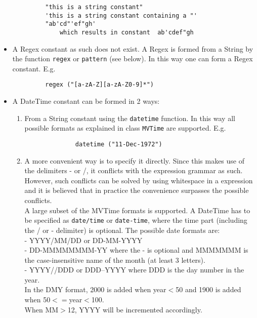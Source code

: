 \begin{itemize}
\begin{verbatim}
         "this is a string constant"
         'this is a string constant containing a "'
         "ab'cd"'ef"gh'
             which results in constant  ab'cdef"gh
       \end{verbatim}
  \item A Regex constant as such does not exist. A Regex is formed from a String
       by the function \texttt{regex} or \texttt{pattern} (see below).
       In this way one can form a Regex constant. E.g.
       \begin{verbatim}
         regex ("[a-zA-Z][a-zA-Z0-9]*")
       \end{verbatim}
  \item A DateTime constant can be formed in 2 ways:
       \begin{enumerate}
         \item From a String constant using the \texttt{datetime} function.
              In this way all possible formats as explained in class
              \texttt{MVTime} are supported. E.g.
              \begin{verbatim}
              datetime ("11-Dec-1972")
              \end{verbatim}
         \item A more convenient way is to specify it directly. Since this
              makes use of the delimiters - or /, it conflicts with the
              expression grammar as such. However, such conflicts can be
              solved by using whitespace in a expression and it is believed
              that in practice the convenience surpasses the possible
              conflicts.
              \\A large subset of the MVTime formats is supported.
              A DateTime has to be specified as \texttt{date/time}
              or \texttt{date-time}, where the time part (including
              the / or - delimiter) is optional.
              The possible date formats are:
              \\- YYYY/MM/DD or DD-MM-YYYY
              \\- DD-MMMMMMMM-YY where the - is optional and MMMMMMM is the
              case-insensitive name of the month (at least 3 letters).
              \\- YYYY//DDD or DDD--YYYY where DDD is the day number in
              the year.
              \\In the DMY format, 2000 is added when year$<$50 and
              1900 is added when 50$<=$year$<$100.
              \\When MM$>$12, YYYY will be incremented accordingly.

\end{enumerate}
\end{itemize}
